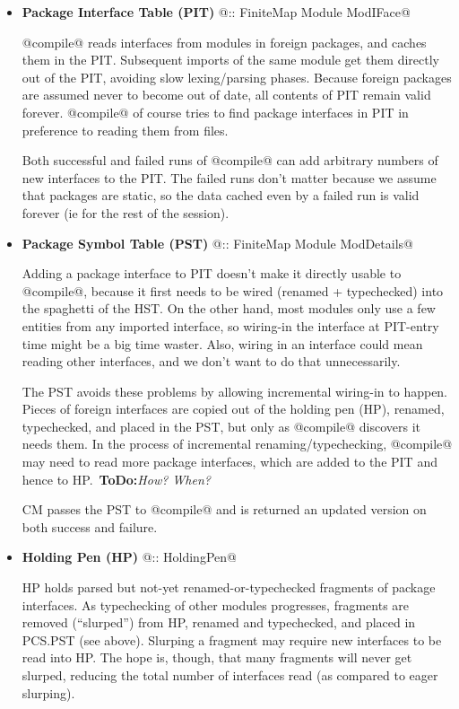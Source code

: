 \documentclass[11pt]{article}
\newcommand{\ToDo}[1]{{{\bf ToDo:}\sl #1}}
\begin{document}
   \begin{itemize}
   \item
      {\bf Package Interface Table (PIT)} @:: FiniteMap Module ModIFace@

   @compile@ reads interfaces from modules in foreign packages, and
   caches them in the PIT.  Subsequent imports of the same module get
   them directly out of the PIT, avoiding slow lexing/parsing phases.
   Because foreign packages are assumed never to become out of date,
   all contents of PIT remain valid forever.  @compile@ of course
   tries to find package interfaces in PIT in preference to reading
   them from files.  

   Both successful and failed runs of @compile@ can add arbitrary
   numbers of new interfaces to the PIT.  The failed runs don't matter
   because we assume that packages are static, so the data cached even
   by a failed run is valid forever (ie for the rest of the session).

   \item
      {\bf Package Symbol Table (PST)} @:: FiniteMap Module ModDetails@

   Adding a package interface to PIT doesn't make it directly usable
   to @compile@, because it first needs to be wired (renamed +
   typechecked) into the spaghetti of the HST.  On the other hand,
   most modules only use a few entities from any imported interface,
   so wiring-in the interface at PIT-entry time might be a big time
   waster.  Also, wiring in an interface could mean reading other
   interfaces, and we don't want to do that unnecessarily.

   The PST avoids these problems by allowing incremental wiring-in to
   happen.  Pieces of foreign interfaces are copied out of the holding
   pen (HP), renamed, typechecked, and placed in the PST, but only as
   @compile@ discovers it needs them.  In the process of incremental
   renaming/typechecking, @compile@ may need to read more package
   interfaces, which are added to the PIT and hence to 
   HP.~\ToDo{How? When?}

   CM passes the PST to @compile@ and is returned an updated version
   on both success and failure.

   \item 
      {\bf Holding Pen (HP)} @:: HoldingPen@ 

   HP holds parsed but not-yet renamed-or-typechecked fragments of
   package interfaces.  As typechecking of other modules progresses,
   fragments are removed (``slurped'') from HP, renamed and
   typechecked, and placed in PCS.PST (see above).  Slurping a
   fragment may require new interfaces to be read into HP.  The hope
   is, though, that many fragments will never get slurped, reducing
   the total number of interfaces read (as compared to eager slurping).

   \end{itemize}
\end{document}
